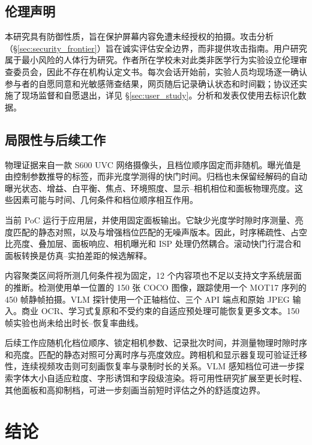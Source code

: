 \documentclass{ieeeaccess}
\begin{document}
\subsection{伦理声明}

本研究具有防御性质，旨在保护屏幕内容免遭未经授权的拍摄。攻击分析（\S\ref{sec:security_frontier}）旨在诚实评估安全边界，而非提供攻击指南。用户研究属于最小风险的人体行为研究。作者所在学校未对此类非医学行为实验设立伦理审查委员会，因此不存在机构认定文书。每次会话开始前，实验人员均现场逐一确认参与者的自愿同意和光敏感筛查结果，网页随后记录确认状态和时间戳；协议还实施了现场监督和自愿退出，详见 \S\ref{sec:user_study}。分析和发表仅使用去标识化数据。

\subsection{局限性与后续工作}

物理证据来自一款 S600 UVC 网络摄像头，且档位顺序固定而非随机。曝光值是由控制参数推导的标签，而非光度学测得的快门时间。归档也未保留经解码的自动曝光状态、增益、白平衡、焦点、环境照度、显示--相机相位和面板物理亮度。这些因素可能与时间、几何条件和档位顺序相互作用。

当前 PoC 运行于应用层，并使用固定面板输出。它缺少光度学时隙时序测量、亮度匹配的静态对照，以及与增强档位匹配的无噪声版本。因此，时序稀疏性、占空比亮度、叠加层、面板响应、相机曝光和 ISP 处理仍然耦合。滚动快门行混合和面板转换是仿真--实拍差距的候选解释。

内容聚类区间将所测几何条件视为固定，12 个内容项也不足以支持文字系统层面的推断。检测使用单一位置的 150 张 COCO 图像，跟踪使用一个 MOT17 序列的 450 帧静帧拍摄。VLM 探针使用一个正轴档位、三个 API 端点和原始 JPEG 输入。商业 OCR、学习式复原和不受约束的自适应预处理可能恢复更多文本。150 帧实验也尚未给出时长--恢复率曲线。

后续工作应随机化档位顺序、锁定相机参数、记录批次时间，并测量物理时隙时序和亮度。匹配的静态对照可分离时序与亮度效应。跨相机和显示器复现可验证迁移性，连续视频攻击则可刻画恢复率与录制时长的关系。VLM 感知档位可进一步探索字体大小自适应粒度、字形诱饵和字段级渲染。将可用性研究扩展至更长时程、其他面板和高抑制档，可进一步刻画当前短时评估之外的舒适度边界。


\section{结论}
\label{sec:conclusion}
\end{document}
